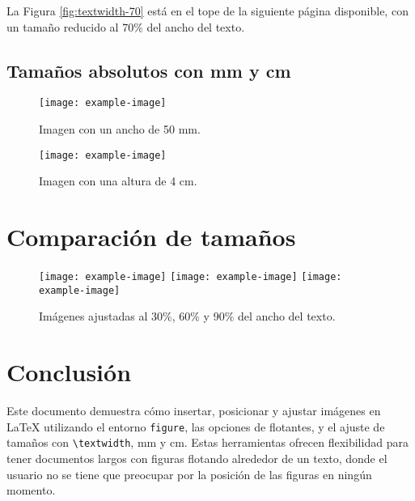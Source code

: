 \documentclass[12pt]{article}
\begin{document}
La Figura \ref{fig:textwidth-70} está en el tope de la siguiente página disponible, con un tamaño reducido al 70\% del ancho del texto.

\subsection{Tamaños absolutos con mm y cm}

\lipsum[8]
\begin{figure}[h]
    \centering
    \texttt{[image: example-image]}
    \caption{Imagen con un ancho de 50 mm.}
    \label{fig:50mm}
\end{figure}

\lipsum[8]

\begin{figure}[h]
    \centering
    \texttt{[image: example-image]}
    \caption{Imagen con una altura de 4 cm.}
    \label{fig:4cm}
\end{figure}

\lipsum[8]

\section{Comparación de tamaños}

\lipsum[8]

\begin{figure}[h]
    \centering
    \texttt{[image: example-image]}
    \texttt{[image: example-image]}
    \texttt{[image: example-image]}
    \caption{Imágenes ajustadas al 30\%, 60\% y 90\% del ancho del texto.}
    \label{fig:comparacion}
\end{figure}

\section{Conclusión}
Este documento demuestra cómo insertar, posicionar y ajustar imágenes en \LaTeX{} utilizando el entorno \texttt{figure}, las opciones de flotantes, y el ajuste de tamaños con \texttt{\textbackslash textwidth}, mm y cm. Estas herramientas ofrecen flexibilidad para tener documentos largos con figuras flotando alrededor de un texto, donde el usuario no se tiene que preocupar por la posición de las figuras en ningún momento. 
\end{document}
